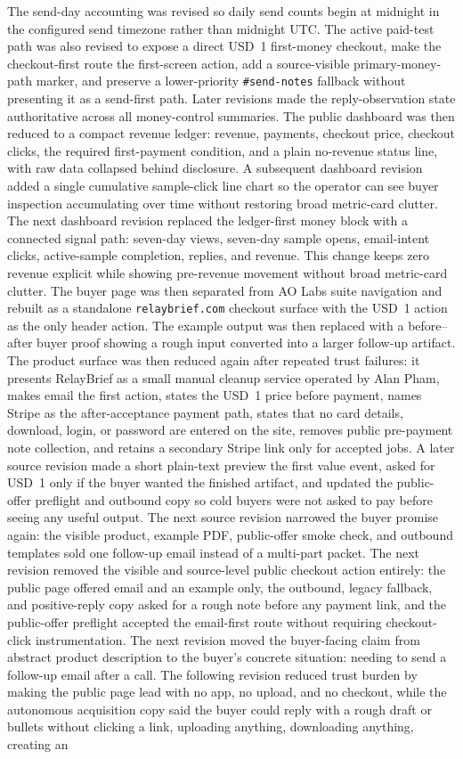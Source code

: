 \documentclass[12pt,letterpaper]{article}
\begin{document}
The send-day accounting was revised so daily send counts begin at midnight in the configured send timezone rather than midnight UTC. The active paid-test path was also revised to expose a direct USD~1 first-money checkout, make the checkout-first route the first-screen action, add a source-visible primary-money-path marker, and preserve a lower-priority \texttt{\#send-notes} fallback without presenting it as a send-first path. Later revisions made the reply-observation state authoritative across all money-control summaries. The public dashboard was then reduced to a compact revenue ledger: revenue, payments, checkout price, checkout clicks, the required first-payment condition, and a plain no-revenue status line, with raw data collapsed behind disclosure. A subsequent dashboard revision added a single cumulative sample-click line chart so the operator can see buyer inspection accumulating over time without restoring broad metric-card clutter. The next dashboard revision replaced the ledger-first money block with a connected signal path: seven-day views, seven-day sample opens, email-intent clicks, active-sample completion, replies, and revenue. This change keeps zero revenue explicit while showing pre-revenue movement without broad metric-card clutter. The buyer page was then separated from AO Labs suite navigation and rebuilt as a standalone \texttt{relaybrief.com} checkout surface with the USD~1 action as the only header action. The example output was then replaced with a before--after buyer proof showing a rough input converted into a larger follow-up artifact. The product surface was then reduced again after repeated trust failures: it presents RelayBrief as a small manual cleanup service operated by Alan Pham, makes email the first action, states the USD~1 price before payment, names Stripe as the after-acceptance payment path, states that no card details, download, login, or password are entered on the site, removes public pre-payment note collection, and retains a secondary Stripe link only for accepted jobs. A later source revision made a short plain-text preview the first value event, asked for USD~1 only if the buyer wanted the finished artifact, and updated the public-offer preflight and outbound copy so cold buyers were not asked to pay before seeing any useful output. The next source revision narrowed the buyer promise again: the visible product, example PDF, public-offer smoke check, and outbound templates sold one follow-up email instead of a multi-part packet. The next revision removed the visible and source-level public checkout action entirely: the public page offered email and an example only, the outbound, legacy fallback, and positive-reply copy asked for a rough note before any payment link, and the public-offer preflight accepted the email-first route without requiring checkout-click instrumentation. The next revision moved the buyer-facing claim from abstract product description to the buyer's concrete situation: needing to send a follow-up email after a call. The following revision reduced trust burden by making the public page lead with no app, no upload, and no checkout, while the autonomous acquisition copy said the buyer could reply with a rough draft or bullets without clicking a link, uploading anything, downloading anything, creating an 
\end{document}
